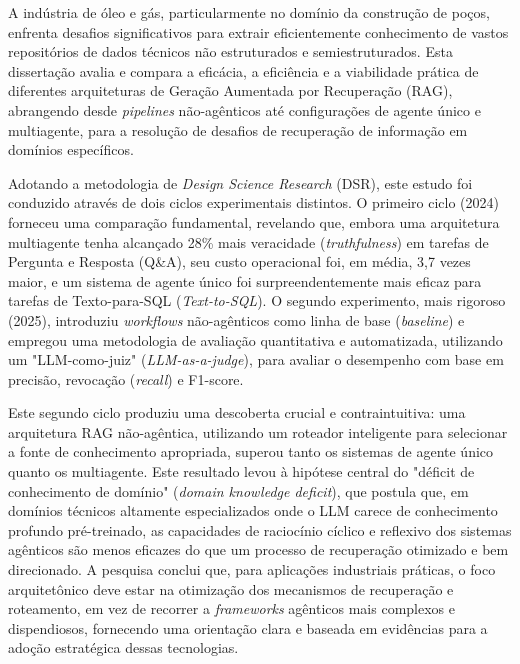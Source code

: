 \documentclass[msc,english]{coppe}
\begin{document}
\begin{foreignabstract}
    
    A indústria de óleo e gás, particularmente no domínio da construção de poços, enfrenta desafios significativos para extrair eficientemente conhecimento de vastos repositórios de dados técnicos não estruturados e semiestruturados. Esta dissertação avalia e compara a eficácia, a eficiência e a viabilidade prática de diferentes arquiteturas de Geração Aumentada por Recuperação (RAG), abrangendo desde \textit{pipelines} não-agênticos até configurações de agente único e multiagente, para a resolução de desafios de recuperação de informação em domínios específicos.

    Adotando a metodologia de \textit{Design Science Research} (DSR), este estudo foi conduzido através de dois ciclos experimentais distintos. O primeiro ciclo (2024) forneceu uma comparação fundamental, revelando que, embora uma arquitetura multiagente tenha alcançado 28\% mais veracidade (\textit{truthfulness}) em tarefas de Pergunta e Resposta (Q\&A), seu custo operacional foi, em média, 3,7 vezes maior, e um sistema de agente único foi surpreendentemente mais eficaz para tarefas de Texto-para-SQL (\textit{Text-to-SQL}). O segundo experimento, mais rigoroso (2025), introduziu \textit{workflows} não-agênticos como linha de base (\textit{baseline}) e empregou uma metodologia de avaliação quantitativa e automatizada, utilizando um "LLM-como-juiz" (\textit{LLM-as-a-judge}), para avaliar o desempenho com base em precisão, revocação (\textit{recall}) e F1-score.
    
    Este segundo ciclo produziu uma descoberta crucial e contraintuitiva: uma arquitetura RAG não-agêntica, utilizando um roteador inteligente para selecionar a fonte de conhecimento apropriada, superou tanto os sistemas de agente único quanto os multiagente. Este resultado levou à hipótese central do "déficit de conhecimento de domínio" (\textit{domain knowledge deficit}), que postula que, em domínios técnicos altamente especializados onde o LLM carece de conhecimento profundo pré-treinado, as capacidades de raciocínio cíclico e reflexivo dos sistemas agênticos são menos eficazes do que um processo de recuperação otimizado e bem direcionado. A pesquisa conclui que, para aplicações industriais práticas, o foco arquitetônico deve estar na otimização dos mecanismos de recuperação e roteamento, em vez de recorrer a \textit{frameworks} agênticos mais complexos e dispendiosos, fornecendo uma orientação clara e baseada em evidências para a adoção estratégica dessas tecnologias.
    
\end{foreignabstract}
\end{document}
